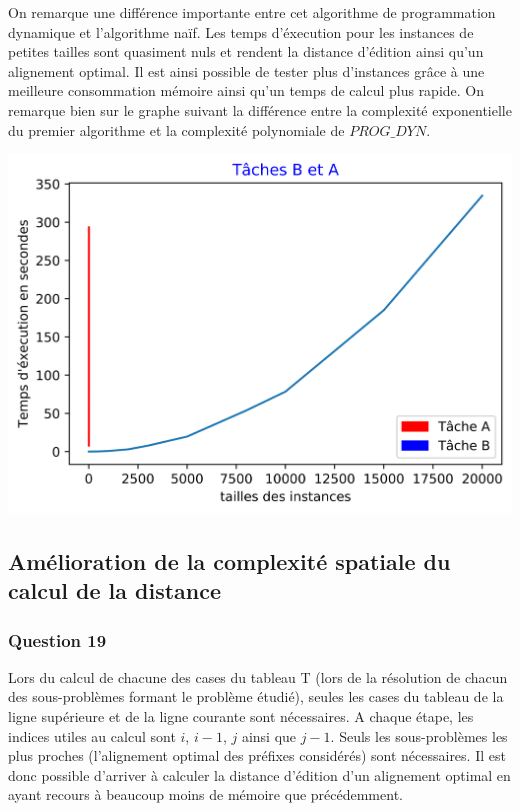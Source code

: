 \documentclass[12pt, a4paper]{report}
\begin{document}
On remarque une différence importante entre cet algorithme de programmation dynamique et l'algorithme naïf. Les temps d'éxecution pour les instances de petites tailles sont quasiment nuls et rendent la distance d'édition ainsi qu'un alignement optimal. Il est ainsi possible de tester plus d'instances grâce à une meilleure consommation mémoire ainsi qu'un temps de calcul plus rapide. On remarque bien sur le graphe suivant la différence entre la complexité exponentielle du premier algorithme et la complexité polynomiale de $PROG\_DYN$.
\begin{center}
\includegraphics[scale=0.75]{TB22.png}

\end{center}

\subsection{Amélioration de la complexité spatiale du calcul de la distance}

\subsubsection{Question 19}
Lors du calcul de chacune des cases du tableau T (lors de la résolution de chacun des sous-problèmes formant le problème étudié), seules les cases du tableau de la ligne supérieure et de la ligne courante sont nécessaires. A chaque étape, les indices utiles au calcul sont $i$, $i-1$, $j$ ainsi que $j-1$. Seuls les sous-problèmes les plus proches (l'alignement optimal des préfixes considérés) sont nécessaires. Il est donc possible d'arriver à calculer la distance d'édition d'un alignement optimal en ayant recours à beaucoup moins de mémoire que précédemment.
\end{document}
